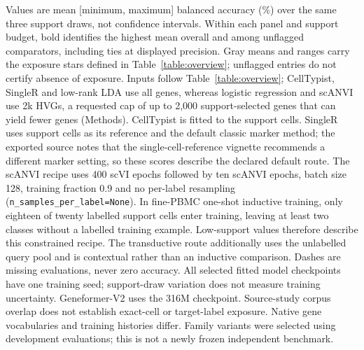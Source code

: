 Values are mean [minimum, maximum] balanced accuracy (\%) over the same three support draws, not confidence intervals. Within each panel and support budget, bold identifies the highest mean overall and among unflagged comparators, including ties at displayed precision. Gray means and ranges carry the exposure stars defined in Table~\ref{table:overview}; unflagged entries do not certify absence of exposure. Inputs follow Table~\ref{table:overview}; CellTypist, SingleR and low-rank LDA use all genes, whereas logistic regression and scANVI use 2k HVGs, a requested cap of up to 2,000 support-selected genes that can yield fewer genes (Methods). CellTypist\citep{dominguezconde2022celltypist} is fitted to the support cells. SingleR\citep{aran2019singler} uses support cells as its reference and the default classic marker method; the exported source notes that the single-cell-reference vignette recommends a different marker setting, so these scores describe the declared default route. The scANVI\citep{xu2021scanvi} recipe uses 400 scVI epochs followed by ten scANVI epochs, batch size 128, training fraction 0.9 and no per-label resampling (\texttt{n\_samples\_per\_label=None}). In fine-PBMC one-shot inductive training, only eighteen of twenty labelled support cells enter training, leaving at least two classes without a labelled training example. Low-support values therefore describe this constrained recipe. The transductive route additionally uses the unlabelled query pool and is contextual rather than an inductive comparison. Dashes are missing evaluations, never zero accuracy. All selected fitted model checkpoints have one training seed; support-draw variation does not measure training uncertainty. Geneformer-V2 uses the 316M checkpoint. Source-study corpus overlap does not establish exact-cell or target-label exposure. Native gene vocabularies and training histories differ. Family variants were selected using development evaluations; this is not a newly frozen independent benchmark.
